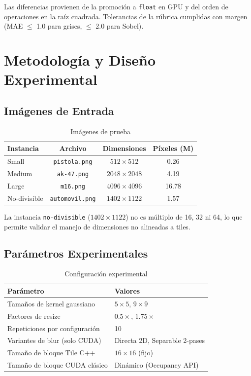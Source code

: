 \documentclass[12pt,a4paper]{article}
\begin{document}
Las diferencias provienen de la promoci\'on a \texttt{float} en GPU y del orden de operaciones en la ra\'iz cuadrada. Tolerancias de la r\'ubrica cumplidas con margen (MAE $\leq$ 1.0 para grises, $\leq$ 2.0 para Sobel).

\section{Metodolog\'ia y Dise\~no Experimental}

\subsection{Im\'agenes de Entrada}

\begin{table}[H]
\centering
\caption{Im\'agenes de prueba}
\begin{tabular}{lccc}
\toprule
\textbf{Instancia} & \textbf{Archivo} & \textbf{Dimensiones} & \textbf{P\'ixeles (M)} \\
\midrule
Small & \texttt{pistola.png} & $512 \times 512$ & 0.26 \\
Medium & \texttt{ak-47.png}  & $2048 \times 2048$ & 4.19 \\
Large & \texttt{m16.png}    & $4096 \times 4096$ & 16.78 \\
No-divisible & \texttt{automovil.png} & $1402 \times 1122$ & 1.57 \\
\bottomrule
\end{tabular}
\end{table}

La instancia \texttt{no-divisible} ($1402 \times 1122$) no es m\'ultiplo de 16, 32 ni 64, lo que permite validar el manejo de dimensiones no alineadas a tiles.

\subsection{Par\'ametros Experimentales}

\begin{table}[H]
\centering
\caption{Configuraci\'on experimental}
\begin{tabular}{ll}
\toprule
\textbf{Par\'ametro} & \textbf{Valores} \\
\midrule
Tama\~nos de kernel gaussiano & $5 \times 5$, $9 \times 9$ \\
Factores de resize & $0.5\times$, $1.75\times$ \\
Repeticiones por configuraci\'on & 10 \\
Variantes de blur (solo CUDA) & Directa 2D, Separable 2-pases \\
Tama\~no de bloque Tile C++ & $16 \times 16$ (fijo) \\
Tama\~no de bloque CUDA cl\'asico & Din\'amico (Occupancy API) \\
\bottomrule
\end{tabular}
\end{table}
\end{document}
